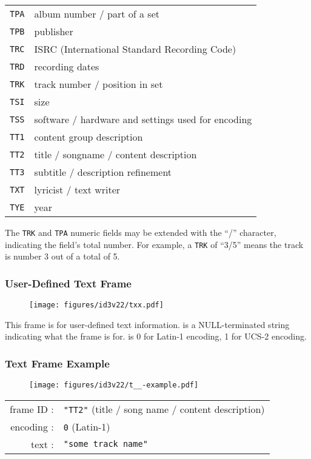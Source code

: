 {\begin{tabular}{r|l}
\texttt{TPA} & album number / part of a set \\
\texttt{TPB} & publisher \\
\texttt{TRC} & ISRC (International Standard Recording Code) \\
\texttt{TRD} & recording dates \\
\texttt{TRK} & track number / position in set \\
\texttt{TSI} & size \\
\texttt{TSS} & software / hardware and settings used for encoding \\
\texttt{TT1} & content group description \\
\texttt{TT2} & title / songname / content description \\
\texttt{TT3} & subtitle / description refinement \\
\texttt{TXT} & lyricist / text writer \\
\texttt{TYE} & year \\
\end{tabular}
}

\clearpage

The \texttt{TRK} and \texttt{TPA} numeric fields may be extended
with the ``/'' character, indicating the field's total number.
For example, a \texttt{TRK} of ``3/5'' means the track is number
3 out of a total of 5.

\subsubsection{User-Defined Text Frame}
\begin{figure}[h]
\texttt{[image: figures/id3v22/txx.pdf]}
\end{figure}
\par
\noindent
This frame is for user-defined text information.
 is a NULL-terminated string indicating
what the frame is for.
 is 0 for Latin-1 encoding, 1 for UCS-2 encoding.

\subsubsection{Text Frame Example}
\begin{figure}[h]
  \texttt{[image: figures/id3v22/t\_\_-example.pdf]}
\end{figure}
\begin{table}[h]
\begin{tabular}{rl}
frame ID : & \texttt{"TT2"} (title / song name / content description) \\
encoding : & \texttt{0} (Latin-1) \\
text : & \texttt{"some track name"}
\end{tabular}
\end{table}

